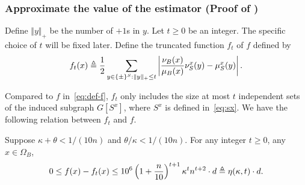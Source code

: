 




\subsubsection{Approximate the value of the estimator (Proof of \texorpdfstring{}{Lg})}\label{sec:hardcore-adv-1}
Define $\Vert y\Vert_+$ be the number of $+1$s in $y$. 
Let $t \geq 0$ be an integer.
The specific choice of $t$ will be fixed later.
Define the truncated function $f_t$ of $f$ defined by 
\begin{align*}
    f_t(x) \triangleq \frac{1}{2}\sum_{y \in \{\pm\}^S: \Vert y\Vert_+\leq t} \left|\frac{\nu_B(x)}{\mu_B(x)}\nu_S^x(y)-\mu_S^x(y)\right|.
\end{align*}

Compared to $f$ in~\eqref{eq:def-f}, $f_t$ only includes the size at most $t$ independent sets of the induced subgraph $G[S^x]$, where $S^x$ is defined in~\eqref{eq:sx}. We have the following relation between $f_t$ and $f$.

\begin{lemma}\label{lem:appf}
  Suppose $\kappa + \theta < 1/(10n)$ and $\theta/\kappa < 1 / (10n)$.
  For any integer $t \geq 0$, any $x\in \Omega_B$,  
  \begin{align}\label{eq:error-t}
  0\leq f(x)-f_t(x)\leq 10^6\left(1+\frac{n}{10}\right)^{t+1} \kappa^t n^{t+2} \cdot d \triangleq \eta(\kappa,t)\cdot d.
  \end{align}
\end{lemma}

